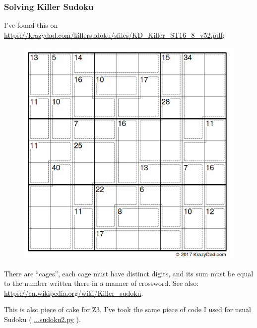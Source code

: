 \subsubsection{Solving Killer Sudoku}

I've found this on \url{https://krazydad.com/killersudoku/sfiles/KD_Killer_ST16_8_v52.pdf}:

\begin{figure}[H]
\centering
\includegraphics[scale=0.6]{puzzles/sudoku/killer/puzzle.png}
\caption{}
\end{figure}

There are ``cages'', each cage must have distinct digits,
and its sum must be equal to the number written there in a manner of crossword.
See also: \url{https://en.wikipedia.org/wiki/Killer_sudoku}.

This is also piece of cake for Z3.
I've took the same piece of code I used for usual Sudoku ( \url{...sudoku2.py} ).

